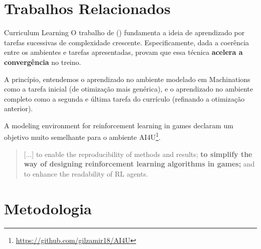 \documentclass[aspectratio=169]{beamer}
\begin{document}
\section{Trabalhos Relacionados}
\begin{frame}{Curriculum Learning}
    O trabalho de \citeauthor{curriculum-learning} (\citeyear{curriculum-learning}) fundamenta a ideia de aprendizado por tarefas sucessivas de complexidade crescente. Especificamente, dada a coerência entre os ambientes e tarefas apresentadas, \citeauthor{curriculum-learning} provam que essa técnica \textbf{acelera a convergência} no treino.

    A princípio, entendemos o aprendizado no ambiente modelado em Machinations como a tarefa inicial (de otimização mais genérica), e o aprendizado no ambiente completo como a segunda e última tarefa do currículo (refinando a otimização anterior).
\end{frame}
\begin{frame}{A modeling environment for reinforcement learning in games}
    \citeauthor{modeling-rl-games} \citeyear{modeling-rl-games} declaram um objetivo muito semelhante para o ambiente AI4U\footnote{\url{https://github.com/gilzamir18/AI4U}}.
    \vspace{0.3cm}

\begin{quote}
    [...] to enable the reproducibility of methods and results; \textbf{to simplify the way of designing reinforcement learning algorithms in games;} and to enhance the readability of RL agents.
\end{quote}


\end{frame}


\section{Metodologia}
\end{document}
